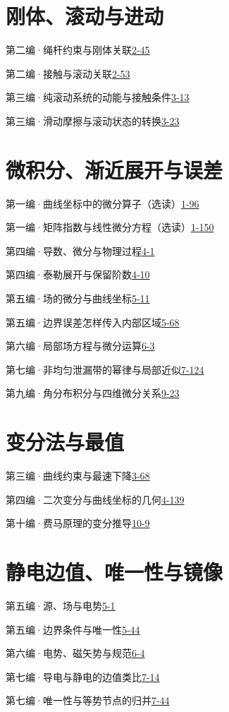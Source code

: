 \section*{刚体、滚动与进动}
\noindent 第二编·绳杆约束与刚体关联\quad\href{course-page:2:47}{2-45}\par
\noindent 第二编·接触与滚动关联\quad\href{course-page:2:55}{2-53}\par
\noindent 第三编·纯滚动系统的动能与接触条件\quad\href{course-page:3:16}{3-13}\par
\noindent 第三编·滑动摩擦与滚动状态的转换\quad\href{course-page:3:26}{3-23}\par
\section*{微积分、渐近展开与误差}
\noindent 第一编·曲线坐标中的微分算子（选读）\quad\href{course-page:1:101}{1-96}\par
\noindent 第一编·矩阵指数与线性微分方程（选读）\quad\href{course-page:1:155}{1-150}\par
\noindent 第四编·导数、微分与物理过程\quad\href{course-page:4:3}{4-1}\par
\noindent 第四编·泰勒展开与保留阶数\quad\href{course-page:4:12}{4-10}\par
\noindent 第五编·场的微分与曲线坐标\quad\href{course-page:5:13}{5-11}\par
\noindent 第五编·边界误差怎样传入内部区域\quad\href{course-page:5:70}{5-68}\par
\noindent 第六编·局部场方程与微分运算\quad\href{course-page:6:6}{6-3}\par
\noindent 第七编·非均匀泄漏带的幂律与局部近似\quad\href{course-page:7:127}{7-124}\par
\noindent 第九编·角分布积分与四维微分关系\quad\href{course-page:9:27}{9-23}\par
\section*{变分法与最值}
\noindent 第三编·曲线约束与最速下降\quad\href{course-page:3:71}{3-68}\par
\noindent 第四编·二次变分与曲线坐标的几何\quad\href{course-page:4:141}{4-139}\par
\noindent 第十编·费马原理的变分推导\quad\href{course-page:10:13}{10-9}\par
\section*{静电边值、唯一性与镜像}
\noindent 第五编·源、场与电势\quad\href{course-page:5:3}{5-1}\par
\noindent 第五编·边界条件与唯一性\quad\href{course-page:5:46}{5-44}\par
\noindent 第六编·电势、磁矢势与规范\quad\href{course-page:6:7}{6-4}\par
\noindent 第七编·导电与静电的边值类比\quad\href{course-page:7:17}{7-14}\par
\noindent 第七编·唯一性与等势节点的归并\quad\href{course-page:7:47}{7-44}\par
